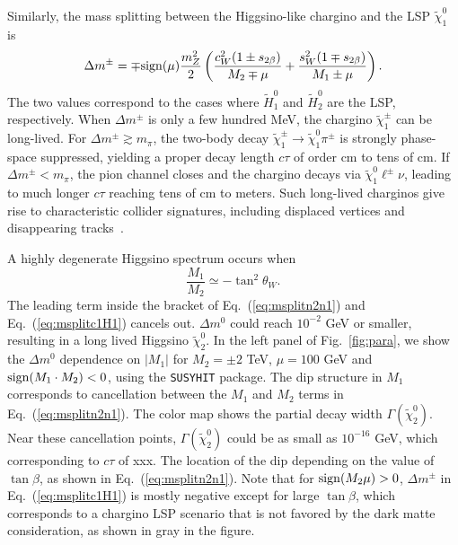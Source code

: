 \documentclass[
    prl,
    twocolumn,
    superscriptaddress,
    nofootinbib,
    amsmath, amssymb,
    aps,
    reprint,
    floatfix
]{revtex4-2}
\newcommand{\Wei}[1]{\textcolor{green2} {Wei: #1}}
\begin{document}
 Similarly, the mass splitting between the Higgsino-like chargino and the LSP $\tilde{\chi}_1^0$ is
 {\small
\begin{equation}
\label{eq:msplitc1N1}
\Delta m^\pm  = \mp {\rm sign}(\mu) \frac{m_Z^2}{2} \left( \frac{ c_W^2 (1 \pm s_{2\beta})}{M_2 \mp \mu }  +  \frac{ s_W^2 (1\mp s_{2\beta})}{M_1 \pm \mu} \right). 
\end{equation}
}
The two values correspond to the cases where $\tilde{H}_1^0$ and $\tilde{H}_2^0$ are the LSP, respectively. When $\Delta m^\pm$ is only a few hundred MeV, the chargino $\tilde\chi_1^\pm$ can be long-lived. For $\Delta m^\pm \gtrsim m_\pi$, the two-body decay $\tilde\chi_1^\pm \to \tilde\chi_1^0 \pi^\pm$ is strongly phase-space suppressed, yielding a proper decay length $c\tau$ of order cm to tens of cm. If $\Delta m^\pm < m_\pi$, the pion channel closes and the chargino decays via $\tilde\chi_1^0 \ell^\pm \nu$, leading to much longer $c\tau$ reaching tens of cm to meters. Such long-lived charginos give rise to characteristic collider signatures, including displaced vertices and disappearing tracks~\cite{Chen:1996ap, ATLAS:2024umc, CMS:2025twk, ATLAS:2022rme, CMS:2023mny}.




A highly degenerate Higgsino spectrum occurs when 
\begin{equation}\label{eq:sim}
	\frac{M_1}{M_2}  \simeq - \tan^2{\theta_W}. 
\end{equation}
The leading term inside the bracket of  Eq.~(\ref{eq:msplitn2n1}) and Eq.~(\ref{eq:msplitc1H1}) cancels out.  $\Delta m^0$ could reach $10^{-2}$ GeV or smaller, resulting in a long lived Higgsino $\tilde\chi_2^0$.
In the left panel of Fig.~\ref{fig:para}, we show the $\Delta m^0$ dependence on $|M_1|$ for $M_2 = \pm 2$ TeV, $\mu=100$ GeV and ${\rm sign}(M_1\cdot M_2)<0$, 
using the \texttt{SUSYHIT} package. The dip structure in $M_1$ corresponds to cancellation between the  $M_1$ and $M_2$ terms in Eq.~(\ref{eq:msplitn2n1}). The color map shows the partial decay width $\Gamma(\tilde{\chi}_2^0)$.  Near these cancellation points, $\Gamma(\tilde{\chi}_2^0)$ could be as small as $10^{-16}$ GeV, which corresponding to $c\tau$ of xxx. The location of the dip depending on the value of $\tan\beta$, as shown in Eq.~(\ref{eq:msplitn2n1}). Note that for ${\rm sign}(M_2\mu)>0$,  $\Delta m^\pm$ in Eq.~(\ref{eq:msplitc1H1}) is mostly negative except for large $\tan\beta$, which corresponds to a chargino LSP scenario that is not favored by the dark matte consideration, as  shown in gray in the figure.
\end{document}
